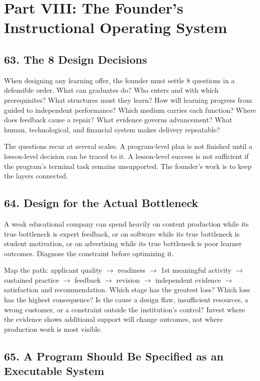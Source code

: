 \section*{Part VIII: The Founder's Instructional Operating System}

\subsection*{63. The 8 Design Decisions}

When designing any learning offer, the founder must settle 8 questions in a defensible order. What can graduates do? Who enters and with which prerequisites? What structures must they learn? How will learning progress from guided to independent performance? Which medium carries each function? Where does feedback cause a repair? What evidence governs advancement? What human, technological, and financial system makes delivery repeatable?

The questions recur at several scales. A program-level plan is not finished until a lesson-level decision can be traced to it. A lesson-level success is not sufficient if the program's terminal task remains unsupported. The founder's work is to keep the layers connected.

\subsection*{64. Design for the Actual Bottleneck}

A weak educational company can spend heavily on content production while its true bottleneck is expert feedback, or on software while its true bottleneck is student motivation, or on advertising while its true bottleneck is poor learner outcomes. Diagnose the constraint before optimizing it.

Map the path: applicant quality $\to$ readiness $\to$ 1st meaningful activity $\to$ sustained practice $\to$ feedback $\to$ revision $\to$ independent evidence $\to$ satisfaction and recommendation. Which stage has the greatest loss? Which loss has the highest consequence? Is the cause a design flaw, insufficient resources, a wrong customer, or a constraint outside the institution's control? Invest where the evidence shows additional support will change outcomes, not where production work is most visible.

\subsection*{65. A Program Should Be Specified as an Executable System}

